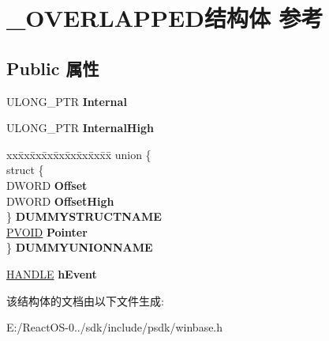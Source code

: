 \hypertarget{struct___o_v_e_r_l_a_p_p_e_d}{}\section{\+\_\+\+O\+V\+E\+R\+L\+A\+P\+P\+E\+D结构体 参考}
\label{struct___o_v_e_r_l_a_p_p_e_d}
\subsection*{Public 属性}
\begin{DoxyCompactItemize}
\item 
\mbox{\label{struct___o_v_e_r_l_a_p_p_e_d_ac8c92b00ead7221d54a5fe410ae6c1ee}} 
U\+L\+O\+N\+G\+\_\+\+P\+TR {\bfseries Internal}
\item 
\mbox{\label{struct___o_v_e_r_l_a_p_p_e_d_af746100a3461b3f4e8a17349e5923fc6}} 
U\+L\+O\+N\+G\+\_\+\+P\+TR {\bfseries Internal\+High}
\item 
\mbox{\label{struct___o_v_e_r_l_a_p_p_e_d_a245667738ae6769adf3f95f4853864f5}} 
\begin{tabbing}
xx\=xx\=xx\=xx\=xx\=xx\=xx\=xx\=xx\=\kill
union \{\\
\>struct \{\\
\>\>DWORD {\bfseries Offset}\\
\>\>DWORD {\bfseries OffsetHigh}\\
\>\} {\bfseries DUMMYSTRUCTNAME}\\
\>\hyperlink{interfacevoid}{PVOID} {\bfseries Pointer}\\
\} {\bfseries DUMMYUNIONNAME}\\

\end{tabbing}\item 
\mbox{\label{struct___o_v_e_r_l_a_p_p_e_d_aa34d425458cd9ae57e8a8bf5aadc2923}} 
\hyperlink{interfacevoid}{H\+A\+N\+D\+LE} {\bfseries h\+Event}
\end{DoxyCompactItemize}


该结构体的文档由以下文件生成\+:\begin{DoxyCompactItemize}
\item 
E\+:/\+React\+O\+S-\/0../sdk/include/psdk/winbase.\+h\end{DoxyCompactItemize}
